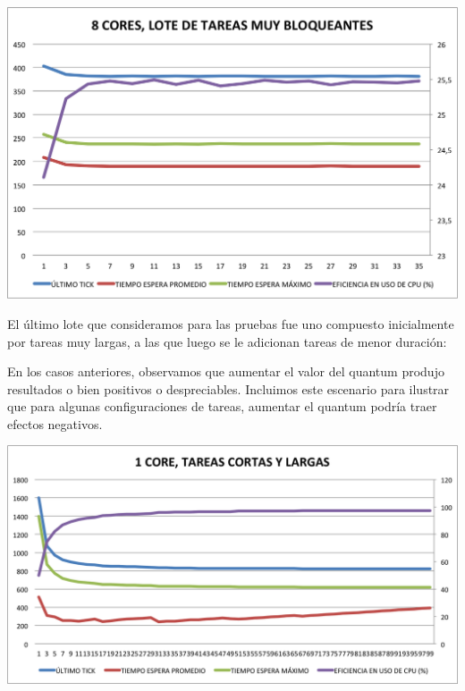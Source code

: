 \begin{center}
	\includegraphics[scale=0.4]{graficos/8cores_loteMuyBloqueante.png} \\
\end{center}


El \'ultimo lote que consideramos para las pruebas fue uno compuesto inicialmente por tareas muy largas, a las que luego se le adicionan tareas de menor duraci\'on:


En los casos anteriores, observamos que aumentar el valor del quantum produjo resultados o bien positivos o despreciables. Incluimos este escenario para ilustrar que para algunas configuraciones de tareas, aumentar el quantum podr\'ia traer efectos negativos.

\begin{center}
	\includegraphics[scale=0.4]{graficos/1core_loteCortasLargas.png} \\
\end{center}

